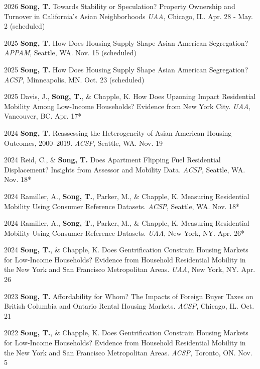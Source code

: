 \documentclass[11pt,letterpaper]{article}
\newcommand{\term}[1]{(#1)}
\begin{document}
\begin{tablist}
    \item[2026] \tab{}\textbf{Song, T.} Towards Stability or Speculation? Property Ownership and Turnover in California's Asian Neighborhoods
    \emph{UAA}, Chicago, IL. Apr. 28 - May. 2 \term{scheduled}

  \item[2025] \tab{}\textbf{Song, T.} How Does Housing Supply Shape Asian American Segregation?  
    \emph{APPAM}, Seattle, WA. Nov. 15 \term{scheduled}

  \item[2025] \tab{}\textbf{Song, T.} How Does Housing Supply Shape Asian American Segregation?  
    \emph{ACSP}, Minneapolis, MN. Oct. 23 \term{scheduled}

  \item[2025] \tab{}Davis, J., \textbf{Song, T.}, \& Chapple, K. How Does Upzoning Impact Residential Mobility Among Low-Income Households? Evidence from New York City.  
    \emph{UAA}, Vancouver, BC. Apr. 17*

  \item[2024] \tab{}\textbf{Song, T.} Reassessing the Heterogeneity of Asian American Housing Outcomes, 2000–2019.  
    \emph{ACSP}, Seattle, WA. Nov. 19

  \item[2024] \tab{}Reid, C., \& \textbf{Song, T.} Does Apartment Flipping Fuel Residential Displacement? Insights from Assessor and Mobility Data.  
    \emph{ACSP}, Seattle, WA. Nov. 18*

  \item[2024] \tab{}Ramiller, A., \textbf{Song, T.}, Parker, M., \& Chapple, K. Measuring Residential Mobility Using Consumer Reference Datasets.  
    \emph{ACSP}, Seattle, WA. Nov. 18*

  \item[2024] \tab{}Ramiller, A., \textbf{Song, T.}, Parker, M., \& Chapple, K. Measuring Residential Mobility Using Consumer Reference Datasets.  
    \emph{UAA}, New York, NY. Apr. 26*

  \item[2024] \tab{}\textbf{Song, T.}, \& Chapple, K. Does Gentrification Constrain Housing Markets for Low-Income Households? Evidence from Household Residential Mobility in the New York and San Francisco Metropolitan Areas.  
    \emph{UAA}, New York, NY. Apr. 26

  \item[2023] \tab{}\textbf{Song, T.} Affordability for Whom? The Impacts of Foreign Buyer Taxes on British Columbia and Ontario Rental Housing Markets.  
    \emph{ACSP}, Chicago, IL. Oct. 21

  \item[2022] \tab{}\textbf{Song, T.}, \& Chapple, K. Does Gentrification Constrain Housing Markets for Low-Income Households? Evidence from Household Residential Mobility in the New York and San Francisco Metropolitan Areas.  
    \emph{ACSP}, Toronto, ON. Nov. 5
\end{tablist}
\end{document}

